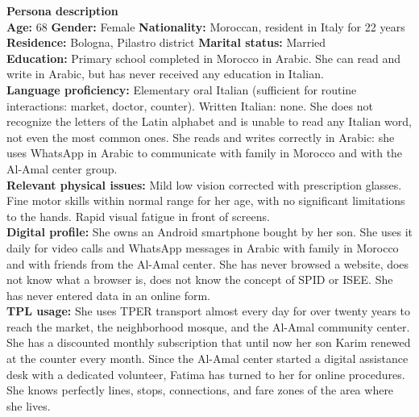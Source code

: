 ﻿\documentclass[11pt,a4paper]{article}
\begin{document}
\begin{center}
\vspace{0.3cm}


\begin{tcolorbox}[base]
    \textbf{Persona description} \\[4pt]
    {\small
    \textbf{Age:} 68 \hfill
    \textbf{Gender:} Female \hfill
    \textbf{Nationality:} Moroccan, resident in Italy for 22 years
    \\[2pt]
    \textbf{Residence:} Bologna, Pilastro district \hfill
    \textbf{Marital status:} Married \\[2pt]
    \textbf{Education:} Primary school completed in Morocco
    in Arabic. She can read and write in Arabic,
    but has never received any education in Italian. \\[2pt]
    \textbf{Language proficiency:} Elementary oral Italian
    (sufficient for routine interactions: market, doctor,
    counter). Written Italian: none. She does not recognize the
    letters of the Latin alphabet and is unable to read
    any Italian word, not even the most common ones.
    She reads and writes correctly in Arabic: she uses WhatsApp
    in Arabic to communicate with family in Morocco
    and with the Al-Amal center group. \\[2pt]
    \textbf{Relevant physical issues:} Mild low vision
    corrected with prescription glasses. Fine motor skills within normal range
    for her age, with no significant limitations to the hands.
    Rapid visual fatigue in front of screens. \\[2pt]
    \textbf{Digital profile:} She owns an Android smartphone
    bought by her son. She uses it daily for
    video calls and WhatsApp messages in Arabic with
    family in Morocco and with friends from the Al-Amal center.
    She has never browsed a website, does not know what
    a browser is, does not know the concept of SPID or ISEE.
    She has never entered data in an online form. \\[2pt]
    \textbf{TPL usage:} She uses TPER transport almost every day
for over twenty years to reach the market, the neighborhood
mosque, and the Al-Amal community center.
She has a discounted monthly subscription that until now
her son Karim renewed at the counter every month.
Since the Al-Amal center started a digital
assistance desk with a dedicated volunteer,
Fatima has turned to her for online procedures.
She knows perfectly lines, stops, connections,
and fare zones of the area where she lives.
    }
\end{tcolorbox}


\end{center}
\end{document}

